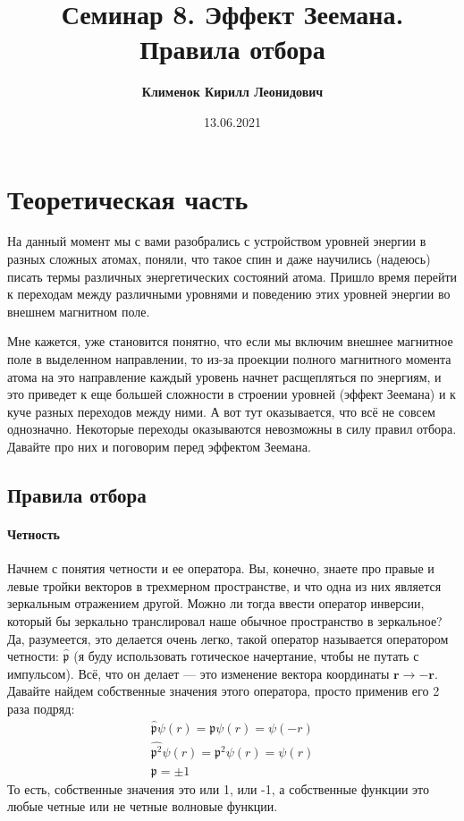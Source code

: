 \documentclass[12pt]{article}
\begin{document}
 
\title{\textbf{Семинар 8. Эффект Зеемана. Правила отбора}}
\author{\textbf{Клименок Кирилл Леонидович}}
\date{13.06.2021}
\maketitle
\section{Теоретическая часть}
На данный момент мы с вами разобрались с устройством уровней энергии в разных сложных атомах, поняли, что такое спин и даже научились (надеюсь) писать термы различных энергетических состояний атома. Пришло время перейти к переходам между различными уровнями и поведению этих уровней энергии во внешнем магнитном поле.

\vspace{1em} \noindent
Мне кажется, уже становится понятно, что если мы включим внешнее магнитное поле в выделенном направлении, то из-за проекции полного магнитного момента атома на это направление каждый уровень начнет расщепляться по энергиям, и это приведет к еще большей сложности в строении уровней (эффект Зеемана) и к куче разных переходов между ними. А вот тут оказывается, что всё не совсем однозначно. Некоторые переходы оказываются невозможны в силу правил отбора. Давайте про них и поговорим перед эффектом Зеемана.

\subsection{Правила отбора}
\paragraph{Четность} Начнем с понятия четности и ее оператора. Вы, конечно, знаете про правые и левые тройки векторов в трехмерном пространстве, и что одна из них является зеркальным отражением другой. Можно ли тогда ввести  оператор инверсии, который бы зеркально транслировал наше обычное пространство в зеркальное? Да, разумеется, это делается очень легко, такой оператор называется оператором четности: $\hat{\mathfrak{p}}$ (я буду использовать готическое начертание, чтобы не путать с импульсом). Всё, что он делает --- это изменение вектора координаты $\textbf{r} \rightarrow -\textbf{r}$. Давайте найдем собственные значения этого оператора, просто применив его 2 раза подряд:
\begin{gather*}
\hat{\mathfrak{p}}\psi(r) = \mathfrak{p} \psi(r)=\psi(-r)\\
\hat{\mathfrak{p}^2}\psi(r) = \mathfrak{p}^2 \psi(r) = \psi(r)\\
\mathfrak{p} = \pm 1
\end{gather*}
То есть, собственные значения это или 1, или -1, а собственные функции это любые четные или не четные волновые функции.
\end{document}
